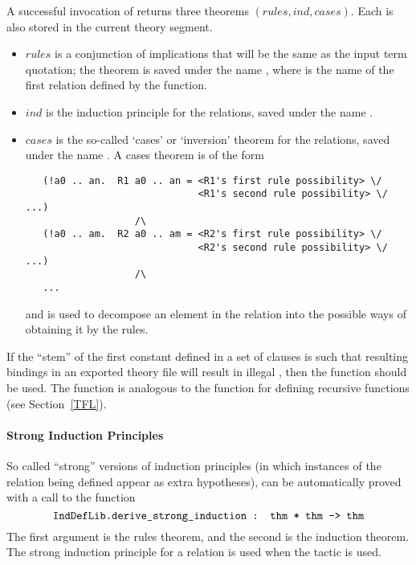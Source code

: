 A successful invocation of  returns three theorems
$(\mathit{rules},\mathit{ind},\mathit{cases})$. Each is also stored in
the current theory segment.
\begin{itemize}
\item $\mathit{rules}$ is a conjunction of implications
that will be the same as the input term quotation; the theorem is
saved under the name , where  is the name of the
first relation defined by the function.
\item $\mathit{ind}$ is the induction principle for the relations,
saved under the name .
\item $\mathit{cases}$ is the so-called `cases' or `inversion' theorem
  for the relations, saved under the name . A cases
  theorem is of the form
%
\begin{verbatim}
   (!a0 .. an.  R1 a0 .. an = <R1's first rule possibility> \/
                              <R1's second rule possibility> \/ ...)
                   /\
   (!a0 .. am.  R2 a0 .. am = <R2's first rule possibility> \/
                              <R2's second rule possibility> \/ ...)
                   /\
   ...
\end{verbatim}
%
and is used to decompose an element in the relation into the
possible ways of obtaining it by the rules.
\end{itemize}

If the ``stem'' of the first constant defined in a set of clauses is such that resulting \ML{} bindings in an exported theory file will result in illegal \ML{}, then the  function should be used.
The \ml{xHol\_reln} function is analogous to the \ml{xDefine} function for defining recursive functions (see Section~\ref{TFL}).

\paragraph{Strong Induction Principles}
So called ``strong'' versions of induction principles (in which instances
of the relation being defined appear as extra hypotheses), can be
automatically proved with a call to the function
\[
\ml{IndDefLib.derive\_strong\_induction : thm * thm -> thm}
\]
The first argument is the rules theorem, and the second is the
induction theorem.
The strong induction principle for a relation is used when the
\ml{Induct\_on} tactic is used.

